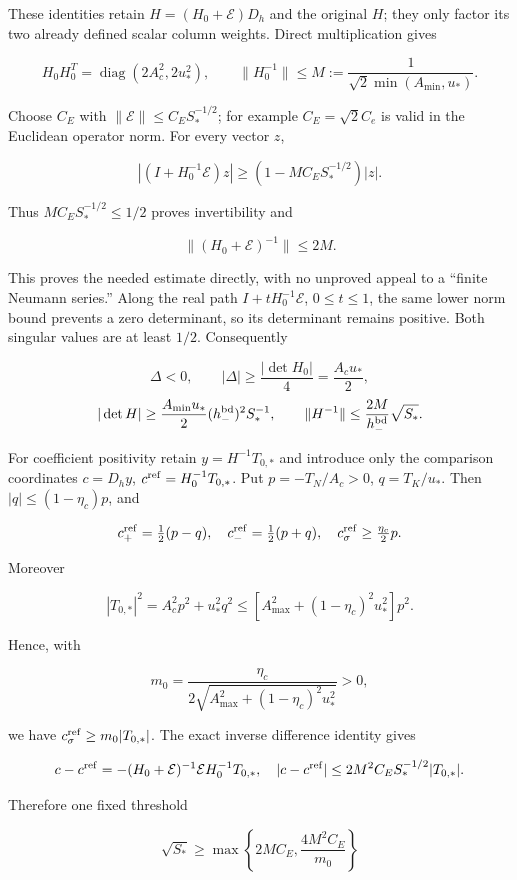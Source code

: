\documentclass[10pt,a4paper]{article}
\begin{document}
These identities retain \(H=(H_0+\mathcal E)D_h\) and the original \(H\); they only factor its two already defined scalar column weights. Direct multiplication gives

\[
H_0H_0^T=\operatorname{diag}(2A_c^2,2u_*^2),
\qquad
\|H_0^{-1}\|\le M:=\frac1{\sqrt2\min(A_{\min},u_*)}.
\]

Choose \(C_E\) with \(\|\mathcal E\|\le C_ES_*^{-1/2}\); for example \(C_E=\sqrt2C_e\) is valid in the Euclidean operator norm. For every vector \(z\),

\[
|(I+H_0^{-1}\mathcal E)z|\ge(1-MC_ES_*^{-1/2})|z|.
\]

Thus \(MC_ES_*^{-1/2}\le1/2\) proves invertibility and

\[
\|(H_0+\mathcal E)^{-1}\|\le 2M.
\]

This proves the needed estimate directly, with no unproved appeal to a ``finite Neumann series.'' Along the real path \(I+tH_0^{-1}\mathcal E\), \(0\le t\le1\), the same lower norm bound prevents a zero determinant, so its determinant remains positive. Both singular values are at least \(1/2\). Consequently

\[
\Delta<0,\qquad |\Delta|\ge \frac{|\det H_0|}{4}=\frac{A_cu_*}{2},
\] \[
|\det H|\ge\frac{A_{\min}u_*}{2}(h_-^{\rm bd})^2S_*^{-1},
\qquad
\|H^{-1}\|\le\frac{2M}{h_-^{\rm bd}}\sqrt{S_*}.
\]

For coefficient positivity retain \(y=H^{-1}T_{0,*}\) and introduce only the comparison coordinates \(c=D_hy\), \(c^{\rm ref}=H_0^{-1}T_{0,*}\). Put \(p=-T_N/A_c>0\), \(q=T_K/u_*\). Then \(|q|\le(1-\eta_c)p\), and

\[
c_+^{\rm ref}=\tfrac12(p-q),\quad c_-^{\rm ref}=\tfrac12(p+q),
\quad c_\sigma^{\rm ref}\ge\tfrac{\eta_c}{2}p.
\]

Moreover

\[
|T_{0,*}|^2=A_c^2p^2+u_*^2q^2
\le [A_{\max}^2+(1-\eta_c)^2u_*^2]p^2.
\]

Hence, with

\[
m_0=\frac{\eta_c}{2\sqrt{A_{\max}^2+(1-\eta_c)^2u_*^2}}>0,
\]

we have \(c_\sigma^{\rm ref}\ge m_0|T_{0,*}|\). The exact inverse difference identity gives

\[
c-c^{\rm ref}=-(H_0+\mathcal E)^{-1}\mathcal E H_0^{-1}T_{0,*},
\quad |c-c^{\rm ref}|\le 2M^2C_ES_*^{-1/2}|T_{0,*}|.
\]

Therefore one fixed threshold

\[
\sqrt{S_*}\ge
\max\left\{2MC_E,\frac{4M^2C_E}{m_0}\right\}
\]
\end{document}
